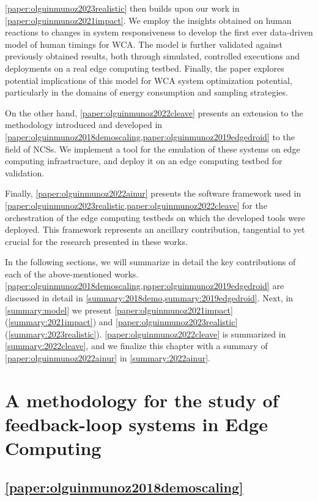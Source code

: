 \cref{paper:olguinmunoz2023realistic} then builds upon our work in \cref{paper:olguinmunoz2021impact}.
We employ the insights obtained on human reactions to changes in system responsiveness to develop the first ever data-driven model of human timings for \ac{WCA}.
The model is further validated against previously obtained results, both through simulated, controlled executions and deployments on a real edge computing testbed.
Finally, the paper explores potential implications of this model for \ac{WCA} system optimization potential, particularly in the domains of energy consumption and sampling strategies.

On the other hand, \cref{paper:olguinmunoz2022cleave} presents an extension to the methodology introduced and developed in \cref{paper:olguinmunoz2018demoscaling,paper:olguinmunoz2019edgedroid} to the field of \aclp{NCS}.
We implement a tool for the emulation of these systems on edge computing infrastructure, and deploy it on an edge computing testbed for validation.

Finally, \cref{paper:olguinmunoz2022ainur} presents the software framework used in \cref{paper:olguinmunoz2023realistic,paper:olguinmunoz2022cleave} for the orchestration of the edge computing testbeds on which the developed tools were deployed.
This framework represents an ancillary contribution, tangential to yet crucial for the research presented in these works.

\medskip%

In the following sections, we will summarize in detail the key contributions of each of the above-mentioned works.
\cref{paper:olguinmunoz2018demoscaling,paper:olguinmunoz2019edgedroid} are discussed in detail in \cref{summary:2018demo,summary:2019edgedroid}.
Next, in \cref{summary:model} we present \cref{paper:olguinmunoz2021impact} (\cref{summary:2021impact}) and \cref{paper:olguinmunoz2023realistic} (\cref{summary:2023realistic}).
\cref{paper:olguinmunoz2022cleave} is summarized in \cref{summary:2022cleave}, and we finalize this chapter with a summary of \cref{paper:olguinmunoz2022ainur} in \cref{summary:2022ainur}.


\section{A methodology for the study of feedback-loop systems in Edge Computing}\label{summary:methodology}

\subsection{\cref{paper:olguinmunoz2018demoscaling}}\label{summary:2018demo}

